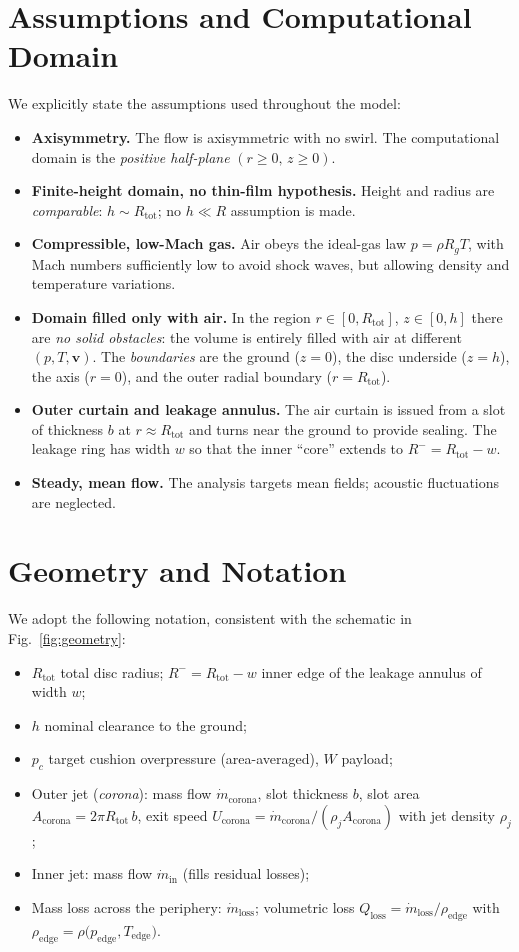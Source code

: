 \documentclass[11pt,a4paper]{article}
\begin{document}
\section{Assumptions and Computational Domain}
We explicitly state the assumptions used throughout the model:
\begin{itemize}
  \item \textbf{Axisymmetry.} The flow is axisymmetric with no swirl. The computational domain is the \emph{positive half-plane} $(r\ge 0,\, z\ge 0)$.
  \item \textbf{Finite-height domain, no thin-film hypothesis.} Height and radius are \emph{comparable}: $h \sim R_{\text{tot}}$; no $h\ll R$ assumption is made.
  \item \textbf{Compressible, low-Mach gas.} Air obeys the ideal-gas law $p=\rho R_g T$, with Mach numbers sufficiently low to avoid shock waves, but allowing density and temperature variations.
  \item \textbf{Domain filled only with air.} In the region $r\in[0,R_{\text{tot}}]$, $z\in[0,h]$ there are \emph{no solid obstacles}: the volume is entirely filled with air at different $(p,T,\mathbf{v})$. The \emph{boundaries} are the ground ($z=0$), the disc underside ($z=h$), the axis ($r=0$), and the outer radial boundary ($r=R_{\text{tot}}$).
  \item \textbf{Outer curtain and leakage annulus.} The air curtain is issued from a slot of thickness $b$ at $r\approx R_{\text{tot}}$ and turns near the ground to provide sealing. The leakage ring has width $w$ so that the inner “core” extends to $R^-=R_{\text{tot}}-w$.
  \item \textbf{Steady, mean flow.} The analysis targets mean fields; acoustic fluctuations are neglected.
\end{itemize}

\section{Geometry and Notation}
We adopt the following notation, consistent with the schematic in Fig.~\ref{fig:geometry}:
\begin{itemize}
  \item $R_{\text{tot}}$ total disc radius; $R^-=R_{\text{tot}}-w$ inner edge of the leakage annulus of width $w$;
  \item $h$ nominal clearance to the ground;
  \item $p_c$ target cushion overpressure (area-averaged), $W$ payload;
  \item Outer jet (\textit{corona}): mass flow $\dot m_{\mathrm{corona}}$, slot thickness $b$, slot area $A_{\mathrm{corona}}=2\pi R_{\text{tot}}\,b$, exit speed $U_{\mathrm{corona}}=\dot m_{\mathrm{corona}}/(\rho_j A_{\mathrm{corona}})$ with jet density $\rho_j$;
  \item Inner jet: mass flow $\dot m_{\mathrm{in}}$ (fills residual losses);
  \item Mass loss across the periphery: $\dot m_{\mathrm{loss}}$; volumetric loss $Q_{\mathrm{loss}}=\dot m_{\mathrm{loss}}/\rho_\mathrm{edge}$ with $\rho_\mathrm{edge}=\rho\!\big(p_\mathrm{edge},T_\mathrm{edge}\big)$.
\end{itemize}
\end{document}
